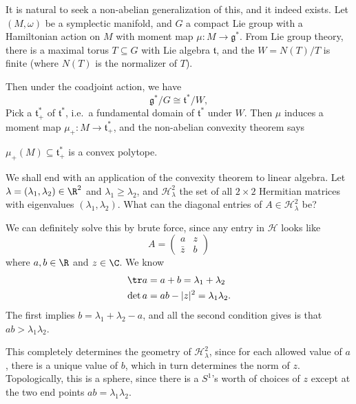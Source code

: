 \documentclass[a4paper]{article}
\begin{document}
It is natural to seek a non-abelian generalization of this, and it indeed exists. Let $(M, \omega)$ be a symplectic manifold, and $G$ a compact Lie group with a Hamiltonian action on $M$ with moment map $\mu: M \to \mathfrak{g}^*$. From Lie group theory, there is a maximal torus $T \subseteq G$ with Lie algebra $\mathfrak{t}$, and the  $W = N(T)/T$ is finite (where $N(T)$ is the normalizer of $T$).

Then under the coadjoint action, we have
\[
  \mathfrak{g}^*/G \cong \mathfrak{t}^*/W,
\]
Pick a  $\mathfrak{t}^*_+$ of $\mathfrak{t}^*$, i.e.\ a fundamental domain of $\mathfrak{t}^*$ under $W$. Then $\mu$ induces a moment map $\mu_+: M \to \mathfrak{t}^*_+$, and the non-abelian convexity theorem says
\begin{thm}[Kirwan, 1984]
  $\mu_+(M) \subseteq \mathfrak{t}^*_+$ is a convex polytope.
\end{thm}

We shall end with an application of the convexity theorem to linear algebra. Let $\lambda = (\lambda_1, \lambda_2) \in \R^2$ and $\lambda_1 \geq \lambda_2$, and $\mathcal{H}^2_\lambda$ the set of all $2 \times 2$ Hermitian matrices with eigenvalues $(\lambda_1, \lambda_2)$. What can the diagonal entries of $A \in \mathcal{H}^2_\lambda$ be?

We can definitely solve this by brute force, since any entry in $\mathcal{H}$ looks like
\[
  A =
  \begin{pmatrix}
    a & z\\
    \bar{z} & b
  \end{pmatrix}
\]
where $a, b \in \R$ and $z \in \C$. We know
\begin{align*}
  \tr a &= a + b = \lambda_1 + \lambda_2\\
  \det a &= ab - |z|^2 = \lambda_1 \lambda_2.
\end{align*}
The first implies $b = \lambda_1 + \lambda_2 - a$, and all the second condition gives is that $ab > \lambda_1 \lambda_2$.
\begin{center}
\end{center}
This completely determines the geometry of $\mathcal{H}^2_\lambda$, since for each allowed value of $a$, there is a unique value of $b$, which in turn determines the norm of $z$. Topologically, this is a sphere, since there is a $S^1$'s worth of choices of $z$ except at the two end points $ab = \lambda_1 \lambda_2$.
\end{document}
